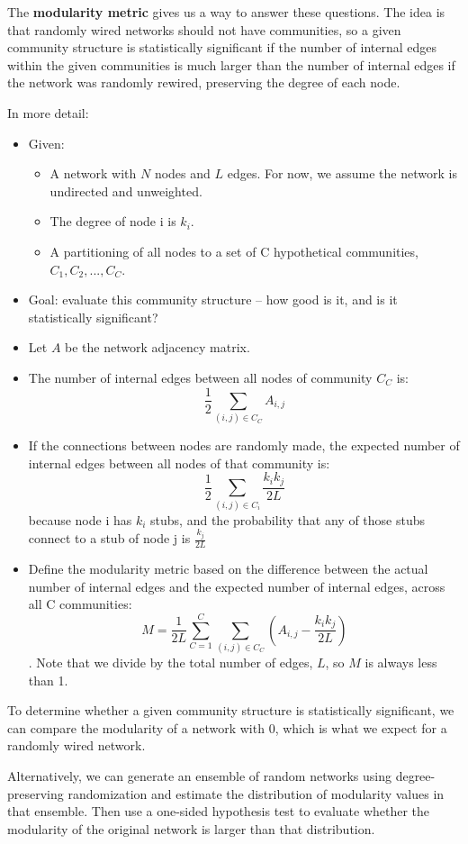 \documentclass[11pt]{scrartcl} %
\begin{document}
The \textbf{modularity metric} gives us a way to answer these questions. The idea is that randomly wired networks should not have communities, so a given community structure is statistically significant if the number of internal edges within the given communities is much larger than the number of internal edges if the network was randomly rewired, preserving the degree of each node.

In more detail:
\begin{itemize}
	\item Given:

		\begin{itemize}
 			\item A network with $N$ nodes and $L$ edges. For now, we assume the network is undirected and unweighted.
			\item The degree of node i is $k_i$.
			\item A partitioning of all nodes to a set of C hypothetical communities, $C_1, C_2, ... , C_C$.
		\end{itemize} 
	\item Goal: evaluate this community structure -- how good is it, and is it statistically significant?
	\item Let $A$ be the network adjacency matrix. 
	\item The number of internal edges between all nodes of community $C_C$ is: \[ \frac{1}{2} \sum_{(i,j)\in C_C} A_{i,j} \]
	\item If the connections between nodes are randomly made, the expected number of internal edges between all nodes of that community is: \[ \frac{1}{2} \sum_{(i,j)\in C_i} \frac{k_i k_j}{2L} \] because node i has $k_i$ stubs, and the probability that any of those stubs connect to a stub of node j is $\frac{k_j}{2L}$
	\item Define the modularity metric based on the difference between the actual number of internal edges and the expected number of internal edges, across all C communities: \[ M = \frac{1}{2L} \sum_{C=1}^{C} \sum_{(i,j)\in C_C} \left(A_{i,j} - \frac{k_i k_j}{2L}\right) \]. Note that we divide by the total number of edges, $L$, so $M$ is always less than 1.
\end{itemize} 

To determine whether a given community structure is statistically significant, we can compare the modularity of a network with $0$, which is what we expect for a randomly wired network.

Alternatively, we can generate an ensemble of random networks using degree-preserving randomization and estimate the distribution of modularity values in that ensemble. Then use a one-sided hypothesis test to evaluate whether the modularity of the original network is larger than that distribution.
\end{document}
